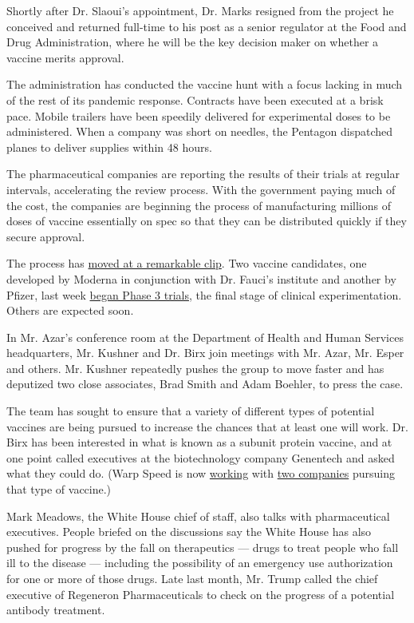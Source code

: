 Shortly after Dr. Slaoui's appointment, Dr. Marks resigned from the
project he conceived and returned full-time to his post as a senior
regulator at the Food and Drug Administration, where he will be the key
decision maker on whether a vaccine merits approval.

The administration has conducted the vaccine hunt with a focus lacking
in much of the rest of its pandemic response. Contracts have been
executed at a brisk pace. Mobile trailers have been speedily delivered
for experimental doses to be administered. When a company was short on
needles, the Pentagon dispatched planes to deliver supplies within 48
hours.

The pharmaceutical companies are reporting the results of their trials
at regular intervals, accelerating the review process. With the
government paying much of the cost, the companies are beginning the
process of manufacturing millions of doses of vaccine essentially on
spec so that they can be distributed quickly if they secure approval.

The process has
\href{https://www.nytimes3xbfgragh.onion/2020/07/14/health/cornavirus-vaccine-moderna.html}{moved
at a remarkable clip}. Two vaccine candidates, one developed by Moderna
in conjunction with Dr. Fauci's institute and another by Pfizer, last
week
\href{https://www.nytimes3xbfgragh.onion/2020/07/27/health/moderna-vaccine-covid.html}{began
Phase 3 trials}, the final stage of clinical experimentation. Others are
expected soon.

In Mr. Azar's conference room at the Department of Health and Human
Services headquarters, Mr. Kushner and Dr. Birx join meetings with Mr.
Azar, Mr. Esper and others. Mr. Kushner repeatedly pushes the group to
move faster and has deputized two close associates, Brad Smith and Adam
Boehler, to press the case.

The team has sought to ensure that a variety of different types of
potential vaccines are being pursued to increase the chances that at
least one will work. Dr. Birx has been interested in what is known as a
subunit protein vaccine, and at one point called executives at the
biotechnology company Genentech and asked what they could do. (Warp
Speed is now
\href{https://www.nytimes3xbfgragh.onion/2020/07/16/health/coronavirus-vaccine-novavax.html}{working}
with
\href{https://www.nytimes3xbfgragh.onion/2020/07/31/health/covid-19-vaccine-sanofi-gsk.html}{two
companies} pursuing that type of vaccine.)

Mark Meadows, the White House chief of staff, also talks with
pharmaceutical executives. People briefed on the discussions say the
White House has also pushed for progress by the fall on therapeutics ---
drugs to treat people who fall ill to the disease --- including the
possibility of an emergency use authorization for one or more of those
drugs. Late last month, Mr. Trump called the chief executive of
Regeneron Pharmaceuticals to check on the progress of a potential
antibody treatment.


